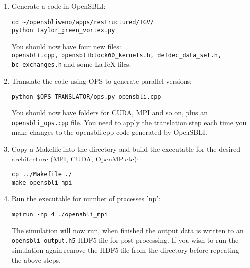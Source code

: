 \documentclass[11pt]{article}
\begin{document}
\begin{enumerate}
\item{Generate a code in OpenSBLI:}
\begin{verbatim}
cd ~/opensbliweno/apps/restructured/TGV/
python taylor_green_vortex.py
\end{verbatim}
You should now have four new files:\\ \verb|opensbli.cpp, opensbliblock00_kernels.h, defdec_data_set.h, bc_exchanges.h| and some LaTeX files.
\item{Translate the code using OPS to generate parallel versions:}
\begin{verbatim}
python $OPS_TRANSLATOR/ops.py opensbli.cpp
\end{verbatim}
You should now have folders for CUDA, MPI and so on, plus an \verb|opensbli_ops.cpp| file. You need to apply the translation step each time you make changes to the opensbli.cpp code generated by OpenSBLI. 

\item{Copy a Makefile into the directory and build the executable for the desired architecture (MPI, CUDA, OpenMP etc):}
\begin{verbatim}
cp ../Makefile ./
make opensbli_mpi
\end{verbatim}

\item{Run the executable for number of processes 'np':}
\begin{verbatim}
mpirun -np 4 ./opensbli_mpi
\end{verbatim}
The simulation will now run, when finished the output data is written to an \verb|opensbli_output.h5| HDF5 file for post-processing. If you wish to run the simulation again remove the HDF5 file from the directory before repeating the above steps.

\end{enumerate}
\end{document}
